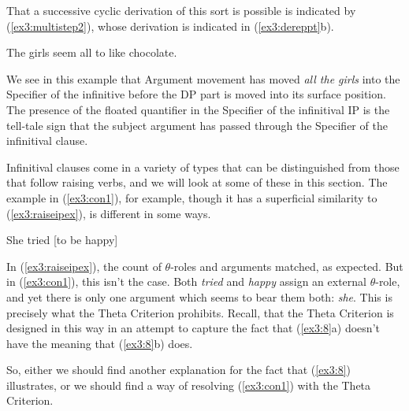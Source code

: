 That a successive cyclic derivation of this sort is possible is indicated by (\ref{ex3:multistep2}), whose derivation is indicated in (\ref{ex3:dereppt}b).
\begin{exe}
	\ex \label{ex3:multistep2} The girls seem all to like chocolate.
\end{exe}
We see in this example that Argument movement has moved \emph{all the girls} into the Specifier of the infinitive before the DP part is moved into its surface position. The presence of the floated quantifier in the Specifier of the infinitival IP is the tell-tale sign that the subject argument has passed through the Specifier of the infinitival clause.

Infinitival clauses come in a variety of types that can be distinguished from those that follow raising verbs, and we will look at some of these in this section. The example in (\ref{ex3:con1}), for example, though it has a superficial similarity to (\ref{ex3:raiseipex}), is different in some ways.
\begin{exe}
	\ex \label{ex3:con1} She tried [to be happy]
\end{exe}
In (\ref{ex3:raiseipex}), the count of  $\theta$-roles and arguments matched, as expected. But in (\ref{ex3:con1}), this isn't the case. Both \emph{tried} and \emph{happy} assign an external  $\theta$-role, and yet there is only one argument which seems to bear them both: \emph{she}. This is precisely what the Theta Criterion prohibits.  Recall, that the Theta Criterion is designed in this way in an attempt to capture the fact that (\ref{ex3:8}a) doesn't have the meaning that (\ref{ex3:8}b) does.
\begin{exe}
	\ex \label{ex3:8} 
	\begin{xlist}
	\end{xlist}
\end{exe}
So, either we should find another explanation for the fact that (\ref{ex3:8}) illustrates, or we should find a way of resolving (\ref{ex3:con1}) with the Theta Criterion.

